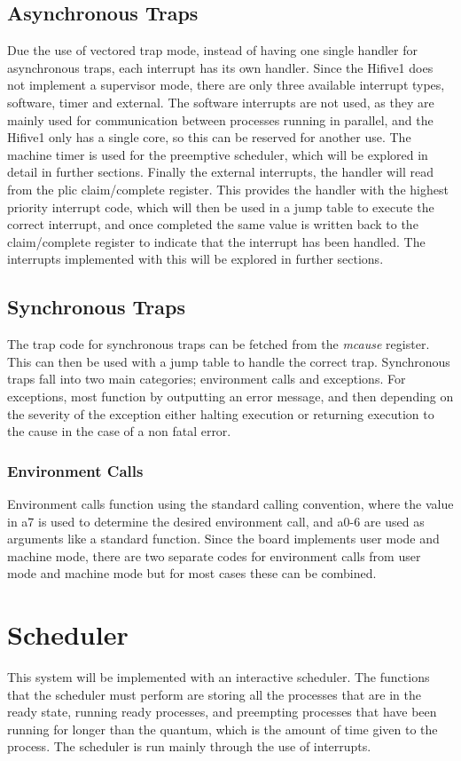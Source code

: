 \subsection{Asynchronous Traps}
Due the use of vectored trap mode, instead of having one single handler for asynchronous traps, each interrupt has its own handler. Since the Hifive1 does not implement a supervisor mode, there are only three available interrupt types, software, timer and external. The software interrupts are not used, as they are mainly used for communication between processes running in parallel, and the Hifive1 only has a single core, so this can be reserved for another use. The machine timer is used for the preemptive scheduler, which will be explored in detail in further sections. Finally the external interrupts, the handler will read from the \ac{plic} claim/complete register. This provides the handler with the highest priority interrupt code, which will then be used in a jump table to execute the correct interrupt, and once completed the same value is written back to the claim/complete register to indicate that the interrupt has been handled. The interrupts implemented with this will be explored in further sections.
\subsection{Synchronous Traps}
The trap code for synchronous traps can be fetched from the \textit{mcause} register. This can then be used with a jump table to handle the correct trap. Synchronous traps fall into two main categories; environment calls and exceptions. For exceptions, most function by outputting an error message, and then depending on the severity of the exception either halting execution or returning execution to the cause in the case of a non fatal error.
\subsubsection{Environment Calls}
Environment calls function using the standard calling convention, where the value in a7 is used to determine the desired environment call, and a0-6 are used as arguments like a standard function. Since the board implements user mode and machine mode, there are two separate codes for environment calls from user mode and machine mode but for most cases these can be combined.
\section{Scheduler}
This system will be implemented with an interactive scheduler. The functions that the scheduler must perform are storing all the processes that are in the ready state, running ready processes, and preempting processes that have been running for longer than the quantum, which is the amount of time given to the process. The scheduler is run mainly through the use of interrupts.
